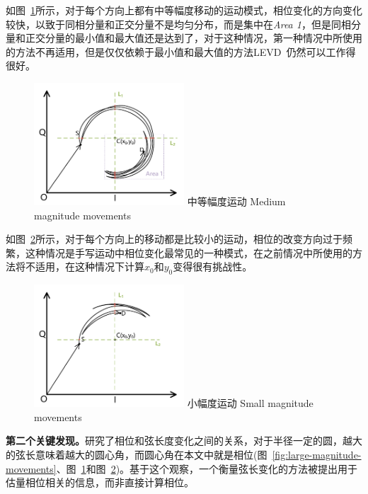 如图~\ref{fig:medium-magnitude-movements}所示，对于每个方向上都有中等幅度移动的运动模式，相位变化的方向变化较快，以致于同相分量和正交分量不是均匀分布，而是集中在\textit{Area 1}，但是同相分量和正交分量的最小值和最大值还是达到了，对于这种情况，第一种情况中所使用的方法不再适用，但是仅仅依赖于最小值和最大值的方法LEVD~\cite{wang2016device}仍然可以工作得很好。
\begin{figure}[!htp]
  \centering
  \includegraphics[width=0.5\textwidth]{figure/medium-magnitude-movement.pdf}
  \bicaption
    {中等幅度运动}
    {Medium magnitude movements}
  \label{fig:medium-magnitude-movements}
\end{figure}

如图~\ref{fig:small-magnitude-movements}所示，对于每个方向上的移动都是比较小的运动，相位的改变方向过于频繁，这种情况是手写运动中相位变化最常见的一种模式，在之前情况中所使用的方法将不适用，在这种情况下计算$x_{0}$和$y_{0}$变得很有挑战性。
\begin{figure}[!htp]
  \centering
  \includegraphics[width=0.5\textwidth]{figure/small-magnitude-movement.pdf}
  \bicaption
    {小幅度运动}
    {Small magnitude movements}
  \label{fig:small-magnitude-movements}
\end{figure}

\textbf{第二个关键发现。}研究了相位和弦长度变化之间的关系，对于半径一定的圆，越大的弦长意味着越大的圆心角，而圆心角在本文中就是相位(图~\ref{fig:large-magnitude-movements}、图~\ref{fig:medium-magnitude-movements}和图~\ref{fig:small-magnitude-movements})。基于这个观察，一个衡量弦长变化的方法被提出用于估量相位相关的信息，而非直接计算相位。

